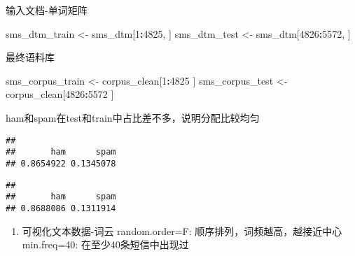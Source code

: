 \documentclass[]{article}
\newenvironment{Shaded}{\begin{snugshade}}{\end{snugshade}}
\newcommand{\KeywordTok}[1]{\textcolor[rgb]{0.13,0.29,0.53}{\textbf{#1}}}
\newcommand{\DecValTok}[1]{\textcolor[rgb]{0.00,0.00,0.81}{#1}}
\newcommand{\StringTok}[1]{\textcolor[rgb]{0.31,0.60,0.02}{#1}}
\newcommand{\OperatorTok}[1]{\textcolor[rgb]{0.81,0.36,0.00}{\textbf{#1}}}
\newcommand{\NormalTok}[1]{#1}
\providecommand{\tightlist}{%
  \setlength{\itemsep}{0pt}\setlength{\parskip}{0pt}}
\begin{document}
输入文档-单词矩阵

\begin{Shaded}
\begin{Highlighting}[]
\NormalTok{sms_dtm_train <-}\StringTok{ }\NormalTok{sms_dtm[}\DecValTok{1}\OperatorTok{:}\DecValTok{4825}\NormalTok{, ]}
\NormalTok{sms_dtm_test <-}\StringTok{ }\NormalTok{sms_dtm[}\DecValTok{4826}\OperatorTok{:}\DecValTok{5572}\NormalTok{, ]}
\end{Highlighting}
\end{Shaded}

最终语料库

\begin{Shaded}
\begin{Highlighting}[]
\NormalTok{sms_corpus_train <-}\StringTok{ }\NormalTok{corpus_clean[}\DecValTok{1}\OperatorTok{:}\DecValTok{4825}\NormalTok{ ]}
\NormalTok{sms_corpus_test <-}\StringTok{ }\NormalTok{corpus_clean[}\DecValTok{4826}\OperatorTok{:}\DecValTok{5572}\NormalTok{ ]}
\end{Highlighting}
\end{Shaded}

ham和spam在test和train中占比差不多，说明分配比较均匀

\begin{Shaded}
\end{Shaded}

\begin{verbatim}
## 
##       ham      spam 
## 0.8654922 0.1345078
\end{verbatim}

\begin{Shaded}
\end{Shaded}

\begin{verbatim}
## 
##       ham      spam 
## 0.8688086 0.1311914
\end{verbatim}

\begin{enumerate}
\def\labelenumi{\arabic{enumi}.}
\setcounter{enumi}{1}
\tightlist
\item
  可视化文本数据-词云 random.order=F: 顺序排列，词频越高，越接近中心
  min.freq=40: 在至少40条短信中出现过
\end{enumerate}
\end{document}
